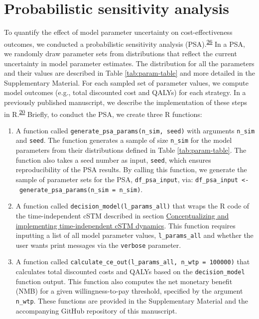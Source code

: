 \documentclass[
]{article}
\providecommand{\tightlist}{%
  \setlength{\itemsep}{0pt}\setlength{\parskip}{0pt}}
\begin{document}
\hypertarget{probabilistic-sensitivity-analysis}{%
\section{Probabilistic sensitivity analysis}\label{probabilistic-sensitivity-analysis}}

To quantify the effect of model parameter uncertainty on cost-effectiveness outcomes, we conducted a probabilistic sensitivity analysis (PSA).\textsuperscript{\protect\hyperlink{ref-Briggs2012}{26}} In a PSA, we randomly draw parameter sets from distributions that reflect the current uncertainty in model parameter estimates. The distribution for all the parameters and their values are described in Table \ref{tab:param-table} and more detailed in the Supplementary Material. For each sampled set of parameter values, we compute model outcomes (e.g., total discounted cost and QALYs) for each strategy. In a previously published manuscript, we describe the implementation of these steps in R.\textsuperscript{\protect\hyperlink{ref-Alarid-Escudero2019e}{20}} Briefly, to conduct the PSA, we create three R functions:

\begin{enumerate}
\def\labelenumi{\arabic{enumi}.}
\tightlist
\item
  A function called \texttt{generate\_psa\_params(n\_sim,\ seed)} with arguments \texttt{n\_sim} and \texttt{seed}. The function generates a sample of size \texttt{n\_sim} for the model parameters from their distributions defined in Table \ref{tab:param-table}. The function also takes a seed number as input, \texttt{seed}, which ensures reproducibility of the PSA results. By calling this function, we generate the sample of parameter sets for the PSA, \texttt{df\_psa\_input}, via: \texttt{df\_psa\_input\ \textless{}-\ generate\_psa\_params(n\_sim\ =\ n\_sim)}.
\item
  A function called \texttt{decision\_model(l\_params\_all)} that wraps the R code of the time-independent cSTM described in section \protect\hyperlink{conceptualizing-and-implementing-time-independent-cSTM-dynamics}{Conceptualizing and implementing time-independent cSTM dynamics}. This function requires inputting a list of all model parameter values, \texttt{l\_params\_all} and whether the user wants print messages via the \texttt{verbose} parameter.
\item
  A function called \texttt{calculate\_ce\_out(l\_params\_all,\ n\_wtp\ =\ 100000)} that calculates total discounted costs and QALYs based on the \texttt{decision\_model} function output. This function also computes the net monetary benefit (NMB) for a given willingness-to-pay threshold, specified by the argument \texttt{n\_wtp}.
  These functions are provided in the Supplementary Material and the accompanying GitHub repository of this manuscript.
\end{enumerate}
\end{document}
